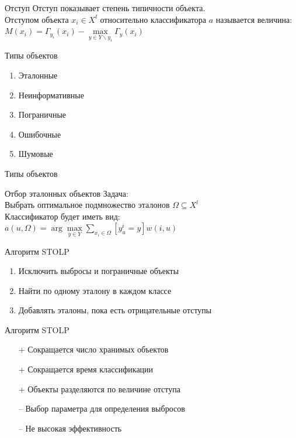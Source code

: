 \documentclass[10pt]{beamer}
\begin{document}
\begin{frame}{Отступ}
	Отступ показывает степень \alert{типичности объекта}.\\
	\bigbreak
	Отступом объекта ${x_i \in X^l}$ относительно классификатора $a$ называется величина:\\
	${M(x_i) = \Gamma_{y_i}(x_i) - \max\limits_{y \in Y\backslash y_i} \Gamma_y(x_i)}$
\end{frame}

\begin{frame}{Типы объектов}
	\begin{enumerate}
		\item Эталонные
		\item Неинформативные
		\item Пограничные	
		\item Ошибочные	
		\item Шумовые	
	\end{enumerate}
\end{frame}

\begin{frame}{Типы объектов}
\end{frame}


\begin{frame}{Отбор эталонных объектов}
	\alert{Задача}:\\
	Выбрать оптимальное подмножество эталонов $\Omega\subseteq X^l$\\ 
    \bigbreak
	Классификатор будет иметь вид:\\
	${a(u, \Omega) = \arg\max\limits_{y \in Y} \sum\limits_{x_i \in \Omega} [y_u^i = y]w(i, u) }$\\
\end{frame}

\begin{frame}{Алгоритм STOLP}
	\begin{enumerate}
		\item Исключить выбросы и пограничные объекты
		\item Найти по одному эталону в каждом классе
		\item Добавлять эталоны, пока есть отрицательные отступы	
	\end{enumerate}
\end{frame}

\begin{frame}{Алгоритм STOLP}
	\begin{itemize} [<+- | alert@+>]
	\item[+] Сокращается число хранимых объектов
	\item[+] Сокращается время классификации
	\item[+] Объекты разделяются по величине отступа
	\bigbreak
	\item[--] Выбор параметра для определения выбросов
	\item[--] Не высокая эффективность
	\end{itemize}
\end{frame}
\end{document}
